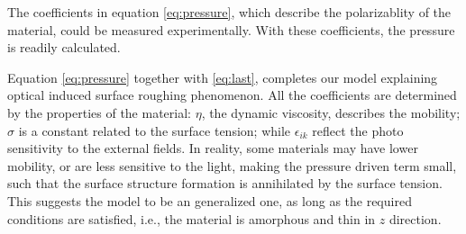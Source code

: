 \documentclass[aps, prl, twocolumn, groupedaddress]{revtex4-1}
\begin{document}
The coefficients in equation \ref{eq:pressure}, which describe the
polarizablity of the material, could be measured experimentally. With
these coefficients, the pressure is readily calculated.

Equation \ref{eq:pressure} together with \ref{eq:last}, completes our
model explaining optical induced surface roughing phenomenon. All the
coefficients are determined by the properties of the material: $\eta$,
the dynamic viscosity, describes the mobility; $\sigma$ is a constant
related to the surface tension; while $\epsilon_{ik}$ reflect the
photo sensitivity to the external fields. In reality, some materials may
have lower mobility, or are less sensitive to the light, making the
pressure driven term small, such that the surface structure
formation is annihilated by the surface tension.
This suggests the model to be an generalized one, as long as the
required conditions are satisfied, i.e., the material is amorphous and
thin in $z$ direction.
\end{document}
